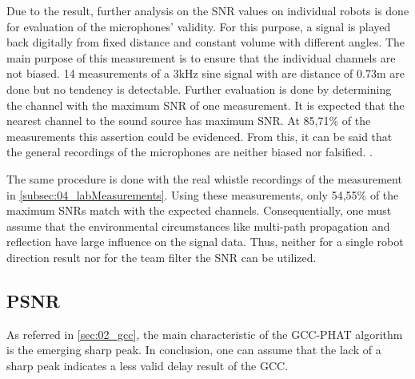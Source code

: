 Due to the result, further analysis on the \ac{SNR} values
on individual robots is done for evaluation of the microphones' validity.
For this purpose, a signal is played back digitally from fixed distance
and constant volume with different angles.
The main purpose of this measurement is to ensure that the individual channels
are not biased.
14 measurements of a 3\si{\kilo\hertz} sine signal
with are distance of 0.73\si{m} are done but no tendency is detectable.
Further evaluation is done by determining the channel with the maximum
\ac{SNR} of one measurement.
It is expected that the nearest channel to the sound source has maximum \ac{SNR}.
At 85,71\si{\percent} of the measurements this assertion could be
evidenced.
From this, it can be said that the general recordings of the microphones
are neither biased nor falsified.
.

The same procedure is done with the real whistle recordings of the
measurement in \cref{subsec:04_labMeasurements}.
Using these measurements, only 54,55\si{\percent} of the maximum \acp{SNR}
match with the expected channels.
Consequentially, one must assume that the environmental circumstances
like multi-path propagation and reflection have large influence
on the signal data.
Thus, neither for a single robot direction result nor for the team filter
the \ac{SNR} can be utilized.

\subsection{PSNR}
\label{subsec:04_psnr}

As referred in \cref{sec:02_gcc}, the main characteristic of the \ac{GCC-PHAT}
algorithm is the emerging sharp peak.
In conclusion, one can assume that the lack of a sharp peak indicates
a less valid delay result of the \ac{GCC}.

